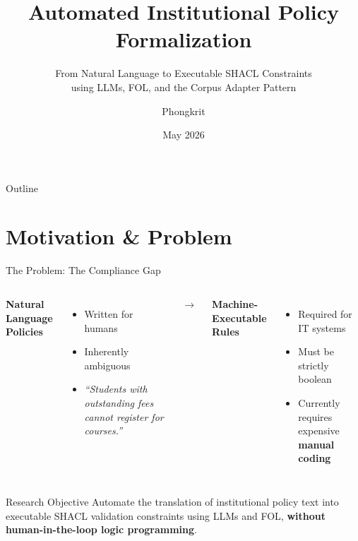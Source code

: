 \documentclass[aspectratio=169, 10pt]{beamer}
\title[Automated Policy Formalization]{Automated Institutional Policy Formalization}
\subtitle{From Natural Language to Executable SHACL Constraints\\using LLMs, FOL, and the Corpus Adapter Pattern}
\author{Phongkrit}
\institute[AIT]{Asian Institute of Technology (AIT) \\ \vspace{0.2cm} \textit{Final Thesis Defense}}
\date{May 2026}
\begin{document}
\begin{frame}
    \titlepage
\end{frame}

\begin{frame}{Outline}
    \tableofcontents
\end{frame}

\section{Motivation \& Problem}

\begin{frame}{The Problem: The Compliance Gap}
    \begin{columns}
        \textbf{Natural Language Policies}
        \begin{itemize}
            \item Written for humans
            \item Inherently ambiguous
            \item \textit{``Students with outstanding fees cannot register for courses.''}
        \end{itemize}
        
        \centering
        \Huge$\rightarrow$
        
        \textbf{Machine-Executable Rules}
        \begin{itemize}
            \item Required for IT systems
            \item Must be strictly boolean
            \item Currently requires expensive \textbf{manual coding}
        \end{itemize}
    \end{columns}
    
    \vspace{0.5cm}
    \begin{alertblock}{Research Objective}
        Automate the translation of institutional policy text into executable SHACL validation constraints using LLMs and FOL, \textbf{without human-in-the-loop logic programming}.
    \end{alertblock}
\end{frame}
\end{document}
